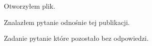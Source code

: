 \documentclass{article}
\begin{document}
Otworzyłem plik.

Znalazłem pytanie odnośnie tej publikacji.

Zadanie pytanie które pozostało bez odpowiedzi.
\end{document}
